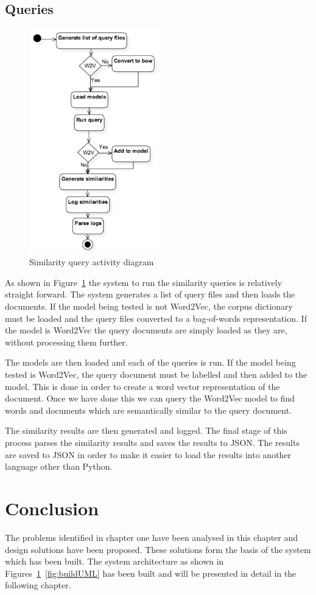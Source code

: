 \subsection{Queries}
\begin{figure}[h]
    \centering
        \includegraphics[width=0.5\textwidth]{Figures/ArchictectureQueryUML.png}
    \caption{Similarity query activity diagram}
    \label{fig:queryUML}
\end{figure}
As shown in Figure~\ref{fig:queryUML} the system to run the similarity queries is relatively straight forward.
The system generates a list of query files and then loads the documents.
If the model being tested is not Word2Vec, the corpus dictionary must be loaded and the query files converted to a bag-of-words representation.
If the model is Word2Vec the query documents are simply loaded as they are, without processing them further.

The models are then loaded and each of the queries is run.
If the model being tested is Word2Vec, the query document must be labelled and then added to the model.
This is done in order to create a word vector representation of the document.
Once we have done this we can query the Word2Vec model to find words and documents which are semantically similar to the query document.

The similarity results are then generated and logged.
The final stage of this process parses the similarity results and saves the results to JSON.
The results are saved to JSON in order to make it easier to load the results into another language other than Python.

\section{Conclusion}
The problems identified in chapter one have been analysed in this chapter and design solutions have been proposed.
These solutions form the basis of the system which has been built.
The system architecture as shown in Figures~\ref{fig:queryUML}~\ref{fig:buildUML} has been built and will be presented in detail in the following chapter.
